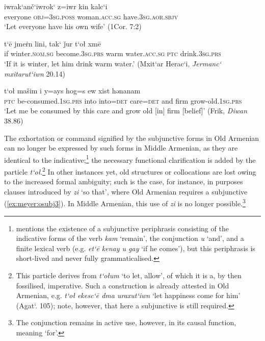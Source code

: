 \documentclass[output=paper,colorlinks,citecolor=brown]{langscibook}
\begin{document}
	\ea \label{ex:meyer:osubj2}
	\gll iwrak‘anč‘iwrok‘ z=iwr kin kalc‘i\\
	everyone \textsc{obj=3sg.poss} woman.\textsc{acc.sg} have.\textsc{3sg.aor.sbjv}\\
	\glt ‘Let everyone have his own wife’ (1Cor. 7:2)
	\z {}
	
	\ea \label{ex:meyer:subj1}
	\gll t‘ē jmeṙn lini, tak‘ ǰur t‘oł xmē\\
	if winter.\textsc{nom.sg} become.\textsc{3sg.prs} warm water.\textsc{acc.sg} \textsc{ptc} drink.\textsc{3sg.prs}\\
	\glt ‘If it is winter, let him drink warm water.’ (Mxit‘ar Herac‘i, \textit{J̌ermanc‘ mxitarut‘iwn} 20.14)
	\z {}
	
	\ea \label{ex:meyer:subj2}
	\gll t‘oł mašim i y=ays hog=s ew xist hənanam\\
	\textsc{ptc} be-consumed.\textsc{1sg.prs} into into=\textsc{det} care=\textsc{det} and firm grow-old.\textsc{1sg.prs}\\
	\glt ‘Let me be consumed by this care and grow old [in] firm [belief]’ (Frik, \textit{Diwan} 38.86)
	\z {}
	
	The exhortation or command signified by the subjunctive forms in Old Armenian can no longer be expressed by such forms in Middle Armenian, as they are identical to the indicative;\footnote{\label{fn:meyer:1}\citet[299–300]{Karst1901} mentions the existence of a subjunctive periphrasis consisting of the indicative forms of the verb \textit{kam} ‘remain’, the conjunction \textit{u} ‘and’, and a finite lexical verb (e.g. \textit{et‘ē kenay u gay} ‘if he comes’), but this periphrasis is short-lived and never fully grammaticalised.} the necessary functional clarification is added by the particle \textit{t‘oł}.\footnote{This particle derives from \textit{t‘ołum} ‘to let, allow’, of which it is a, by then fossilised, imperative. Such a construction is already attested in Old Armenian, e.g. \textit{t‘oł ekesc‘ē dma uraxut‘iwn} ‘let happiness come for him’ (Agat‘. 105); note, however, that here a subjunctive is still required.} In other instances yet, old structures or collocations are lost owing to the increased formal ambiguity; such is the case, for instance, in purposes clauses introduced by \textit{zi} ‘so that’, where Old Armenian requires a subjunctive (\ref{ex:meyer:osubj3}). In Middle Armenian, this use of \textit{zi} is no longer possible.\footnote{The conjunction remains in active use, however, in its causal function, meaning ‘for’.}
	
\end{document}

